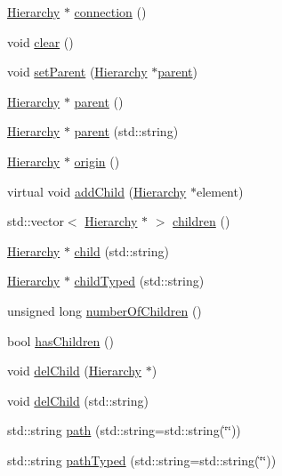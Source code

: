\begin{DoxyCompactItemize}
\hyperlink{classHierarchy}{Hierarchy} $\ast$ \hyperlink{classElement_af57444353c1ddf9fa0109801e97debf7}{connection} ()
\item 
void \hyperlink{classHierarchy_af4d43b0765b402670eed2d62c73405af}{clear} ()
\item 
void \hyperlink{classHierarchy_a585ad1aeec16077a0e532ab8b4fc557b}{set\+Parent} (\hyperlink{classHierarchy}{Hierarchy} $\ast$\hyperlink{classHierarchy_a1c7bec8257e717f9c1465e06ebf845fc}{parent})
\item 
\hyperlink{classHierarchy}{Hierarchy} $\ast$ \hyperlink{classHierarchy_a1c7bec8257e717f9c1465e06ebf845fc}{parent} ()
\item 
\hyperlink{classHierarchy}{Hierarchy} $\ast$ \hyperlink{classHierarchy_ad550588733bf75ac5c0fcfd7c8fd11a6}{parent} (std\+::string)
\item 
\hyperlink{classHierarchy}{Hierarchy} $\ast$ \hyperlink{classHierarchy_aee461dc930ce3871636ff87f075b1b83}{origin} ()
\item 
virtual void \hyperlink{classHierarchy_ad677774ff38fcb257c04a3a10d471fac}{add\+Child} (\hyperlink{classHierarchy}{Hierarchy} $\ast$element)
\item 
std\+::vector$<$ \hyperlink{classHierarchy}{Hierarchy} $\ast$ $>$ \hyperlink{classHierarchy_aa9a76f69e98e052ee1a6e32cea006288}{children} ()
\item 
\hyperlink{classHierarchy}{Hierarchy} $\ast$ \hyperlink{classHierarchy_a1e207f973c694b538bf90107b4868817}{child} (std\+::string)
\item 
\hyperlink{classHierarchy}{Hierarchy} $\ast$ \hyperlink{classHierarchy_a0c15a5276a3b80b4354d6bd8a01e0708}{child\+Typed} (std\+::string)
\item 
unsigned long \hyperlink{classHierarchy_ab16e84de65fd84e14001a6cf941c8be4}{number\+Of\+Children} ()
\item 
bool \hyperlink{classHierarchy_a255174fe4d316d2a3f430dcb9dab29f1}{has\+Children} ()
\item 
void \hyperlink{classHierarchy_a2b2b359fac003233f65786a616766bde}{del\+Child} (\hyperlink{classHierarchy}{Hierarchy} $\ast$)
\item 
void \hyperlink{classHierarchy_a1928ac7615fe0b5e55cd707f70dc6781}{del\+Child} (std\+::string)
\item 
std\+::string \hyperlink{classHierarchy_aa7990fa7caf132d83e361ce033c6c65a}{path} (std\+::string=std\+::string(\char`\"{}\char`\"{}))
\item 
std\+::string \hyperlink{classHierarchy_a1efd56cd164d328d2002e53a10a19b8c}{path\+Typed} (std\+::string=std\+::string(\char`\"{}\char`\"{}))

\end{DoxyCompactItemize}

